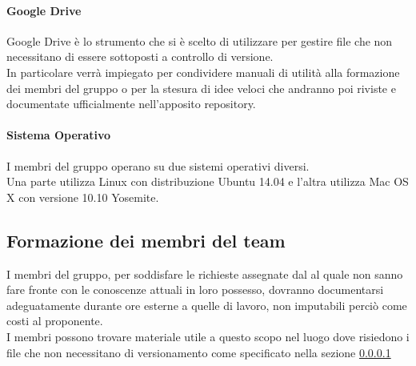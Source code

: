 			\paragraph{Google Drive} \label{sec:google_drive}
			Google Drive è lo strumento che si è scelto di utilizzare per gestire file che non necessitano di essere sottoposti a controllo di versione. \\
			In particolare verrà impiegato per condividere manuali di utilità alla formazione dei membri del gruppo o per la stesura di idee veloci che andranno poi riviste e documentate ufficialmente nell'apposito repository.
			\paragraph{Sistema Operativo}
			I membri del gruppo operano su due sistemi operativi diversi. \\
			Una parte utilizza Linux con distribuzione Ubuntu 14.04 e l'altra utilizza Mac OS X con versione 10.10 Yosemite.

	\subsection{Formazione dei membri del team}
	I membri del gruppo, per soddisfare le richieste assegnate dal \roleProjectManager{} al quale non sanno fare fronte con le conoscenze attuali in loro possesso, dovranno documentarsi adeguatamente durante ore esterne a quelle di lavoro, non imputabili perciò come costi al proponente.\\
	I membri possono trovare materiale utile a questo scopo nel luogo dove risiedono i file che non necessitano di versionamento come specificato nella sezione \ref{sec:google_drive}